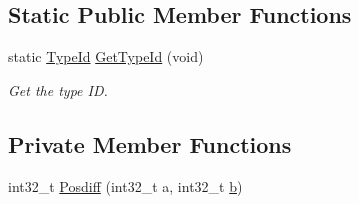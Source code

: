 \subsection*{Static Public Member Functions}
\begin{DoxyCompactItemize}
\item 
static \hyperlink{classns3_1_1TypeId}{Type\+Id} \hyperlink{classns3_1_1DynamicQueueLimits_a48fa5aa72ebd0ff946f4c41a24847470}{Get\+Type\+Id} (void)
\begin{DoxyCompactList}\small\item\em Get the type ID. \end{DoxyCompactList}\end{DoxyCompactItemize}
\subsection*{Private Member Functions}
\begin{DoxyCompactItemize}
\item 
int32\+\_\+t \hyperlink{classns3_1_1DynamicQueueLimits_ab4177a222243fb17528c5dfeb1f6c7da}{Posdiff} (int32\+\_\+t a, int32\+\_\+t \hyperlink{lte__pathloss_8m_a21ad0bd836b90d08f4cf640b4c298e7c}{b})
\end{DoxyCompactItemize}
